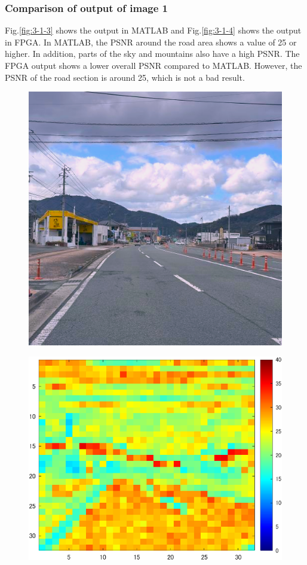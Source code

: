 \documentclass[conference]{IEEEtran}
\begin{document}
\subsubsection{Comparison of output of image 1 }%
Fig.\ref{fig:3-1-3} shows the output in MATLAB and Fig.\ref{fig:3-1-4} shows the output in FPGA.
In MATLAB, the PSNR around the road area shows a value of 25 or higher.
In addition, parts of the sky and mountains also have a high PSNR.
The FPGA output shows a lower overall PSNR compared to MATLAB.
However, the PSNR of the road section is around 25, which is not a bad result.
\begin{figure}[tb]
  \begin{minipage}[t]{0.32\columnwidth}
    \centering
    \includegraphics[width=0.9\columnwidth]{figures/Ex_pr1.png}
    \label{fig:3-1-2}
  \end{minipage}
  \begin{minipage}[t]{0.32\linewidth}
    \centering
    \includegraphics[width=0.9\columnwidth]{figures/Ex_re1.png}

\end{minipage}
\end{figure}
\end{document}
